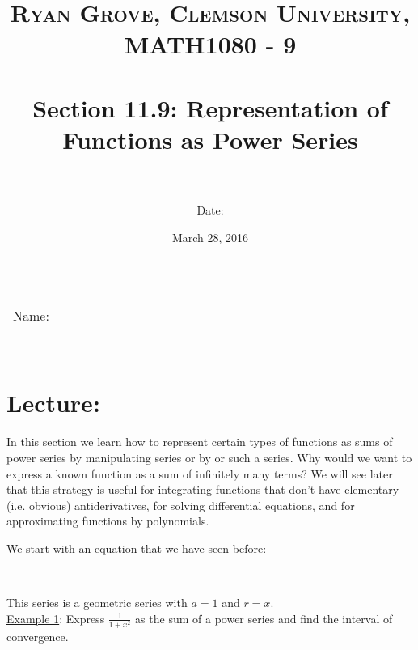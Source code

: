 \documentclass[paper=a4, fontsize=11pt]{scrartcl} %
\title{	
\normalfont \normalsize 
\textsc{Ryan Grove, Clemson University, MATH1080 - 9} \\ [25pt] %
\horrule{0.5pt} \\[0.4cm] %
\huge Section 11.9: Representation of Functions as Power Series\\ %
\horrule{2pt} \\[0.5cm] %
}
\author{Date:} %
\date{\normalsize March 28, 2016} %
\numberwithin{equation}{section} %
\numberwithin{figure}{section} %
\numberwithin{table}{section} %
\newcommand{\ds}{\displaystyle}
\begin{document}
\maketitle %

\begin{flushleft}
\begin{tabular}{l l}
Name: \rule{3.2in}{.01cm}  & {}%
\end{tabular}
\end{flushleft}


\section*{\textbf{Lecture:}}
In this section we learn how to represent certain types of functions as sums of power series by manipulating \underline{\hspace{1.25in}} series or by \underline{\hspace{1.65in}} or \underline{\hspace{1.65in}} such a series. Why would we want to express a known function as a sum of infinitely many terms? We will see later that this strategy is useful for integrating functions that don't have elementary (i.e. obvious) antiderivatives, for solving differential equations, and for approximating functions by polynomials.\\
\indent

We start with an equation that we have seen before:\\
\indent

\fbox{
  \parbox{\textwidth}{
  \vspace{5pt} 
  
  \[[1] \hspace{1in} \ds\frac{1}{1-x} = 1 + x + xˆ2 + xˆ3 + \cdots = \ds\sum_{n=0}^\infty x^n \quad \quad |x|<1 \]
  
  }}
  \indent\\
  \indent
  
  This series is a geometric series with $a=1$ and $r=x$.\\
  \indent
  \newpage
  \underline{Example 1}: Express $\ds\frac{1}{1+x^2}$ as the sum of a power series and find the interval of convergence.\\
  \indent
  
\end{document}
